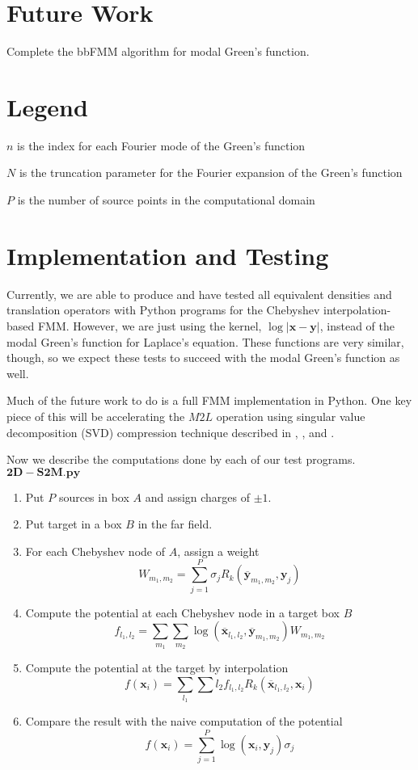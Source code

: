 \documentclass[11pt, oneside]{article}   	%
\begin{document}
\section{Future Work}
Complete the bbFMM algorithm for modal Green's function.

\begin{appendices}
\section{Legend}
$n$ is the index for each Fourier mode of the Green's function

$N$ is the truncation parameter for the Fourier expansion of the Green's function

$P$ is the number of source points in the computational domain



\section{Implementation and Testing}
Currently, we are able to produce and have tested all equivalent densities and translation operators with Python programs for the Chebyshev interpolation-based FMM. However, we are just using the kernel, $\log|\mathbf{x}-\mathbf{y}|$, instead of the modal Green's function for Laplace's equation. These functions are very similar, though, so we expect these tests to succeed with the modal Green's function as well.

Much of the future work to do is a full FMM implementation in Python. One key piece of this will be accelerating the $M2L$ operation using singular value decomposition (SVD) compression technique described in \cite{CGMR}, \cite{FD}, and  \cite{MV}.

Now we describe the computations done by each of our test programs.\\
$\mathbf{2D-S2M.py}$
\begin{enumerate}
\item Put $P$ sources in box $A$ and assign charges of $\pm 1$.
\item Put target in a box $B$ in the far field.
\item For each Chebyshev node of $A$, assign a weight\\
$$W_{m_1,m_2}=\sum_{j=1}^P \sigma_j R_k(\mathbf{\overline{y}}_{m_1,m_2},\mathbf{y}_j)$$
\item Compute the potential at each Chebyshev node in a target box $B$\\
$$f_{l_1,l_2}=\sum_{m_1}\sum_{m_2} \log(\mathbf{\overline{x}}_{l_1,l_2},\mathbf{\overline{y}}_{m_1,m_2}) W_{m_1,m_2}$$
\item Compute the potential at the target by interpolation\\
$$f(\mathbf{x}_i)=\sum_{l_1}\sum{l_2} f_{l_1,l_2} R_k(\mathbf{\overline{x}}_{l_1,l_2},\mathbf{x}_i)$$
\item Compare the result with the naive computation of the potential\\
$$f(\mathbf{x}_i)=\sum_{j=1}^P \log(\mathbf{x}_i,\mathbf{y}_j) \sigma_j$$
\end{enumerate}


\end{appendices}
\end{document}
